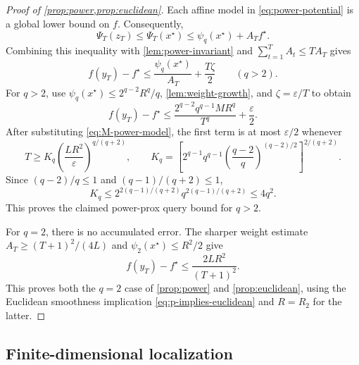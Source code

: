 \documentclass[11pt]{article}
\newcommand{\eps}{\varepsilon}
\theoremstyle{definition}
\theoremstyle{remark}
\begin{document}
\begin{proof}[Proof of \cref{prop:power,prop:euclidean}]
Each affine model in \cref{eq:power-potential} is a global lower bound
on $f$.  Consequently,
\begin{equation}
\label{eq:power-compare-star}
 \Psi_T(z_T)\le\Psi_T(x^\star)
              \le\psi_q(x^\star)+A_Tf^\star.
\end{equation}
Combining this inequality with \cref{lem:power-invariant} and
$\sum_{t=1}^T A_t\le T A_T$ gives
\begin{equation}
\label{eq:power-gap-general}
 f(y_T)-f^\star\le\frac{\psi_q(x^\star)}{A_T}
                         +\frac{T\zeta}{2}
 \qquad(q>2).
\end{equation}
For $q>2$, use $\psi_q(x^\star)\le2^{q-2}R^q/q$,
\cref{lem:weight-growth}, and $\zeta=\eps/T$ to obtain
\begin{equation}
\label{eq:power-gap-expanded}
 f(y_T)-f^\star
 \le\frac{2^{q-2}q^{q-1}MR^q}{T^q}+\frac\eps2.
\end{equation}
After substituting \cref{eq:M-power-model}, the first term is at most
$\eps/2$ whenever
\[
 T\ge K_q\left(\frac{LR^2}{\eps}\right)^{q/(q+2)},
 \qquad
 K_q=\left[
 2^{q-1}q^{q-1}
 \left(\frac{q-2}{q}\right)^{(q-2)/2}
 \right]^{2/(q+2)}.
\]
Since $(q-2)/q\le1$ and $(q-1)/(q+2)\le1$,
\[
 K_q\le 2^{2(q-1)/(q+2)}q^{2(q-1)/(q+2)}
       \le4q^2.
\]
This proves the claimed power-prox query bound for $q>2$.

For $q=2$, there is no accumulated error.  The sharper weight estimate
$A_T\ge(T+1)^2/(4L)$ and $\psi_2(x^\star)\le R^2/2$ give
\[
 f(y_T)-f^\star\le\frac{2LR^2}{(T+1)^2}.
\]
This proves both the $q=2$ case of \cref{prop:power} and
\cref{prop:euclidean}, using the Euclidean smoothness implication
\cref{eq:p-implies-euclidean} and $R=R_2$ for the latter.
\end{proof}

\subsection{Finite-dimensional localization}
\end{document}
